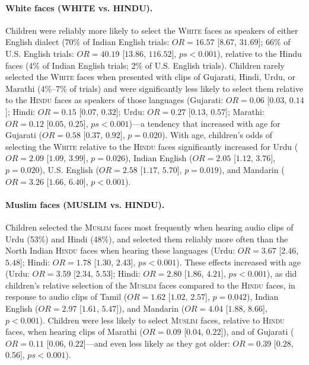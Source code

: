 \documentclass{foushee-adapted-preprint}
\begin{document}
\paragraph{White faces {(W{\small{HITE}} vs. H{\small{INDU}})}.}
Children were reliably more likely to select the \textsc{White} faces %
as speakers of either English dialect (70\% of Indian English trials: $OR=16.57$ [$8.67$, $31.69$]; 66\% of U.S. English trials: $OR=40.19$ [$13.86$, $116.52$], $ps<0.001$), relative to the Hindu faces (4\% of Indian English trials; 2\% of U.S. English trials). 
Children rarely selected the \textsc{White} faces when presented with clips of Gujarati, Hindi, Urdu, or Marathi (4\%--7\% of trials) and were significantly less likely to select them relative to the \textsc{Hindu} faces as speakers of those languages (Gujarati: $OR=0.06$ [$0.03$, $0.14$]; Hindi: $OR=0.15$ [$0.07$, $0.32$]; Urdu: $OR=0.27$ [$0.13$, $0.57$]; Marathi: $OR=0.12$ [$0.05$, $0.25$], $ps<0.001$)---a tendency that increased with age for Gujarati ($OR=0.58$ [$0.37$, $0.92$], $p=0.020$). 
With age, children's odds of selecting the \textsc{White} relative to the \textsc{Hindu} faces significantly increased for Urdu ($OR=2.09$ [$1.09$, $3.99$], $p=0.026$), Indian English ($OR=2.05$ [$1.12$, $3.76$], $p=0.020$), U.S. English ($OR=2.58$ [$1.17$, $5.70$], $p=0.019$), and Mandarin ($OR=3.26$ [$1.66$, $6.40$], $p<0.001$).

\paragraph{Muslim faces {(M{\small{USLIM}} vs. H{\small{INDU}})}.} 
Children selected the \textsc{Muslim} faces most frequently when hearing audio clips of Urdu (53\%) and Hindi (48\%), and selected them reliably more often than the North Indian \textsc{Hindu} faces when hearing these languages (Urdu: $OR=3.67$ [$2.46$, $5.48$]; Hindi: $OR=1.78$ [$1.30$, $2.43$], $ps<0.001$). These effects increased with age (Urdu: $OR=3.59$ [$2.34$, $5.53$]; Hindi: $OR=2.80$ [$1.86$, $4.21$], $ps<0.001$), as did children's relative selection of the \textsc{Muslim} faces compared to the \textsc{Hindu} faces, in response to audio clips of Tamil ($OR=1.62$ [$1.02$, $2.57$], $p=0.042$), Indian English ($OR=2.97$ [$1.61$, $5.47$]), and Mandarin ($OR=4.04$ [$1.88$, $8.66$], $p<0.001$). 
Children were less likely to select \textsc{Muslim} faces, relative to \textsc{Hindu} faces, when hearing clips of Marathi ($OR=0.09$ [$0.04$, $0.22$]), and of Gujarati ($OR=0.11$ [$0.06$, $0.22$]---and even less likely as they got older: $OR=0.39$ [$0.28$, $0.56$], $ps<0.001$).
\end{document}
